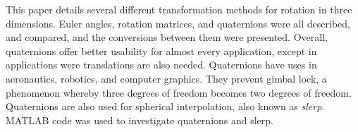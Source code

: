 This paper details several different transformation methods for rotation in three dimensions.
Euler angles, rotation matrices, and quaternions were all described, and compared, and the conversions between them were presented.
Overall, quaternions offer better usability for almost every application, except in applications were translations are also needed.
Quaternions have uses in aeronautics, robotics, and computer graphics.
They prevent gimbal lock, a phenomenon whereby three degrees of freedom becomes two degrees of freedom.
Quaternions are also used for spherical interpolation, also known as \textit{slerp}.
MATLAB code was used to investigate quaternions and slerp.
